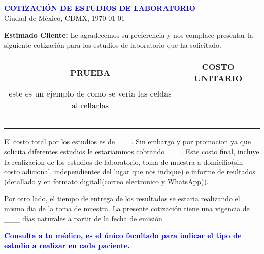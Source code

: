 \documentclass[a4paper,12pt]{article}
\theoremstyle{mytheoremstyle}
\theoremstyle{mytheoremstyle}
\theoremstyle{myproblemstyle}
\begin{document}
\begin{flushleft}
\end{flushleft}

\begin{flushright}
    \textcolor{blue}{\textbf{COTIZACIÓN DE ESTUDIOS DE LABORATORIO}} \\
    Ciudad de México, CDMX, \today 
\end{flushright}
    

    \begin{flushleft} 
        \textbf{\sffamily  Estimado Cliente:}
        \newline  %
        \sffamily  %
        Le agradecemos su preferencia y nos complace presentar la siguiente cotización para los estudios de laboratorio que ha solicitado. 
    \end{flushleft}


    \begin{center}
        \begin{tabular}{|c|c|} 
        \hline 
        \textbf{PRUEBA} &  \textbf{COSTO UNITARIO} 
        \\ \hline 
         este es un ejemplo de como se veria las celdas al rellarlas &    \\ \hline
             &    \\ \hline
             &    \\ \hline
             &    \\ \hline
             &    \\ \hline
             &    \\ \hline
        \end{tabular}
        \end{center}
    
        \begin{flushleft}
        \end{flushleft}



    \begin{flushleft}
        \sffamily  %
        El costo total por los estudios es de $\_\_\_\_\_$ . Sin embargo y por promocion ya que solicita diferentes estudios le estariammos cobrando $\_\_\_\_\_$ .  Este costo final, incluye
        la realizacion de los estudios de laboratorio, toma de muestra a domicilio(sin costo adicional, independientes del lugar que nos indique) e informe de reultados (detallado y en formato digitall(correo electronico y WhatsApp)).\newline

        Por otro lado, el tiempo de entrega de los resultados se estaria realizando el mismo dia de la toma de muestra. \newline
        La presente cotización tiene una vigencia de \_\_\_ días naturales a partir de la fecha de emisión.
    \end{flushleft}


    \begin{flushleft}
    \end{flushleft}

    \begin{center}
        \textcolor{blue}{\textbf{\sffamily Consulta a tu médico, es el único facultado para indicar el tipo de estudio a realizar en cada paciente.}}
    \end{center}
\end{document}
